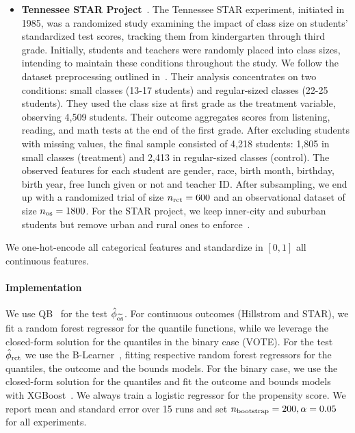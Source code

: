 \begin{itemize}
    \item \textbf{Tennessee STAR Project}~\citep{word1990state}. The Tennessee STAR experiment, initiated in 1985, was a randomized study examining the impact of class size on students' standardized test scores, tracking them from kindergarten through third grade. Initially, students and teachers were randomly placed into class sizes, intending to maintain these conditions throughout the study. We follow the dataset preprocessing outlined in~\citep{kallus2018removing}.  Their analysis concentrates on two conditions: small classes (13-17 students) and regular-sized classes (22-25 students). They used the class size at first grade as the treatment variable, observing 4,509  students. Their outcome aggregates scores from listening, reading, and math tests at the end of the first grade. After excluding students with missing values, the final sample consisted of 4,218 students: 1,805 in small classes (treatment) and 2,413 in regular-sized classes (control). The observed features for each student are gender, race, birth month, birthday, birth year, free lunch given or not and teacher ID.  After subsampling, we end up with a randomized trial of size $n_{\operatorname{rct}}=600$ and an observational dataset of size $n_{\operatorname{os}}=1800$. For the STAR project, we keep inner-city and suburban students but remove urban and rural ones to enforce~.
\end{itemize}

We one-hot-encode all categorical features and standardize in $[0, 1]$ all continuous features.

\paragraph{Implementation }We use QB~\citep{dorn2022sharp} for the test $\hat{\phi}_{\widetilde{\mathrm{os}}}$. For continuous outcomes (Hillstrom and STAR), we fit a random forest regressor for the quantile functions, while we leverage the closed-form solution for the quantiles in the binary case (VOTE). For the test $\hat{\phi}_{\mathrm{rct}}$ we use the B-Learner~\citep{oprescu2023b}, fitting respective random forest regressors for the quantiles, the outcome and the bounds models. For the binary case, we use the closed-form solution for the quantiles and fit the outcome and bounds models with XGBoost~\citep{chen2015xgboost}. We always train a logistic regressor for the propensity score.  We report mean and standard error over 15 runs and set $n_{\text{bootstrap}} = 200, \alpha=0.05$ for all experiments.




